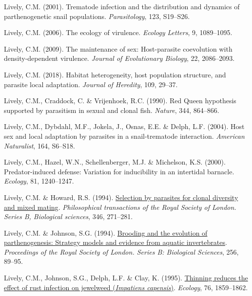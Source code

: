 \documentclass[
  letterpaper,
]{book}
\newlength{\cslhangindent}
\newenvironment{CSLReferences}[2] %
 {\begin{list}{}{%
  \setlength{\itemindent}{0pt}
  \setlength{\leftmargin}{0pt}
  \setlength{\parsep}{0pt}
  \ifodd #1
   \setlength{\leftmargin}{\cslhangindent}
   \setlength{\itemindent}{-1\cslhangindent}
  \fi
  \setlength{\itemsep}{#2\baselineskip}}}
 {\end{list}}
\begin{document}
\begin{CSLReferences}{1}{0}
Lively, C.M. (2001). Trematode infection and the distribution and
dynamics of parthenogenetic snail populations. \emph{Parasitology}, 123,
S19--S26.

Lively, C.M. (2006). The ecology of virulence. \emph{Ecology Letters},
9, 1089--1095.

Lively, C.M. (2009). The maintenance of sex: Host-parasite coevolution
with density-dependent virulence. \emph{Journal of Evolutionary
Biology}, 22, 2086--2093.

Lively, C.M. (2018). Habitat heterogeneity, host population structure,
and parasite local adaptation. \emph{Journal of Heredity}, 109, 29--37.

Lively, C.M., Craddock, C. \& Vrijenhoek, R.C. (1990). {Red Queen}
hypothesis supported by parasitism in sexual and clonal fish.
\emph{Nature}, 344, 864--866.

Lively, C.M., Dybdahl, M.F., Jokela, J., Osnas, E.E. \& Delph, L.F.
(2004). Host sex and local adaptation by parasites in a snail-trematode
interaction. \emph{American Naturalist}, 164, S6--S18.

Lively, C.M., Hazel, W.N., Schellenberger, M.J. \& Michelson, K.S.
(2000). Predator-induced defense: Variation for inducibility in an
intertidal barnacle. \emph{Ecology}, 81, 1240--1247.

Lively, C.M. \& Howard, R.S. (1994).
\href{https://doi.org/10.1098/rstb.1994.0144}{Selection by parasites for
clonal diversity and mixed mating}. \emph{Philosophical transactions of
the Royal Society of London. Series B, Biological sciences}, 346,
271--281.

Lively, C.M. \& Johnson, S.G. (1994).
\href{https://doi.org/10.1098/rspb.1994.0054}{Brooding and the evolution
of parthenogenesis: Strategy models and evidence from aquatic
invertebrates}. \emph{Proceedings of the Royal Society of London. Series
B: Biological Sciences}, 256, 89--95.

Lively, C.M., Johnson, S.G., Delph, L.F. \& Clay, K. (1995).
\href{https://doi.org/10.2307/1940718}{Thinning reduces the effect of
rust infection on jewelweed (\emph{{I}mpatiens capensis})}.
\emph{Ecology}, 76, 1859--1862.


\end{CSLReferences}
\end{document}
